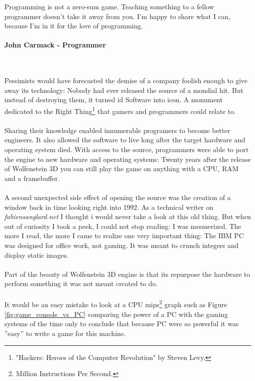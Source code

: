  \begin{fancyquotes}
   Programming is not a zero-sum game. Teaching something to a fellow programmer doesn't take it away from you. I'm happy to share what I can, because I'm in it for the love of programming.\\
   \\
\textbf{John Carmack - Programmer}
 \end{fancyquotes}\\
\\
Pessimists would have forecasted the demise of a company foolish enough to give away its technology: Nobody had ever released the source of a mondial hit. But instead of destroying them, it turned id Software into icon. A monument dedicated to the Right Thing\footnote{"Hackers: Heroes of the Computer Revolution" by Steven Levy.} that gamers and programmers could relate to.\\
\\
Sharing their knowledge enabled innumerable programers to become better engineers. It also allowed the software to live long after the target hardware and operating system died. With access to the source, programmers were able to port the engine to new hardware and operating systems: Twenty years after the release of Wolfenstein 3D you can still play the game on anything with a CPU, RAM and a framebuffer. \\
\\
A second unexpected side effect of opening the source was the creation of a window back in time looking right into 1992. As a technical writer on \emph{fabiensanglard.net} I thought i would never take a look at this old thing. But when out of curiosity I took a peek, I could not stop reading: I was mesmerized. The more I read, the more I came to realize one very important thing: The IBM PC was designed for office work, not gaming. It was meant to crunch integers and display static images.\\
\\ 
Part of the beauty of Wolfenstein 3D engine is that its repurpose the hardware to perform something it was not meant created to do.\\
\\
It would be an easy mistake to look at a CPU mips\footnote{Million Instructions Per Second.} graph such as Figure \ref{fig:game_console_vs_PC} comparing the power of a PC with the gaming systems of the time only to conclude that because PC were so powerful it was ''easy'' to write a game for this machine. \\
